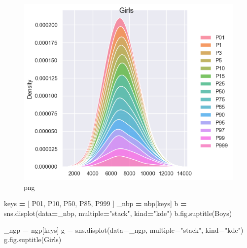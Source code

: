 \documentclass[
]{article}
\newenvironment{Shaded}{\begin{snugshade}}{\end{snugshade}}
\newcommand{\NormalTok}[1]{#1}
\newcommand{\OperatorTok}[1]{\textcolor[rgb]{0.81,0.36,0.00}{\textbf{#1}}}
\newcommand{\StringTok}[1]{\textcolor[rgb]{0.31,0.60,0.02}{#1}}
\begin{document}
\begin{figure}
\centering
\includegraphics{output_33_2.png}
\caption{png}
\end{figure}

\begin{Shaded}
\begin{Highlighting}[]
\NormalTok{keys }\OperatorTok{=}\NormalTok{ [}
 \StringTok{\textquotesingle{}P01\textquotesingle{}}\NormalTok{,}
 \StringTok{\textquotesingle{}P10\textquotesingle{}}\NormalTok{,}
 \StringTok{\textquotesingle{}P50\textquotesingle{}}\NormalTok{,}
 \StringTok{\textquotesingle{}P85\textquotesingle{}}\NormalTok{,}
 \StringTok{\textquotesingle{}P999\textquotesingle{}}
\NormalTok{]}
\NormalTok{\_nbp }\OperatorTok{=}\NormalTok{ nbp[keys]}
\NormalTok{b }\OperatorTok{=}\NormalTok{ sns.displot(data}\OperatorTok{=}\NormalTok{\_nbp, multiple}\OperatorTok{=}\StringTok{"stack"}\NormalTok{, kind}\OperatorTok{=}\StringTok{"kde"}\NormalTok{)}
\NormalTok{b.fig.suptitle(}\StringTok{\textquotesingle{}Boys\textquotesingle{}}\NormalTok{)}

\NormalTok{\_ngp }\OperatorTok{=}\NormalTok{ ngp[keys]}
\NormalTok{g }\OperatorTok{=}\NormalTok{ sns.displot(data}\OperatorTok{=}\NormalTok{\_ngp, multiple}\OperatorTok{=}\StringTok{"stack"}\NormalTok{, kind}\OperatorTok{=}\StringTok{"kde"}\NormalTok{)}
\NormalTok{g.fig.suptitle(}\StringTok{\textquotesingle{}Girls\textquotesingle{}}\NormalTok{)}
\end{Highlighting}
\end{Shaded}
\end{document}
